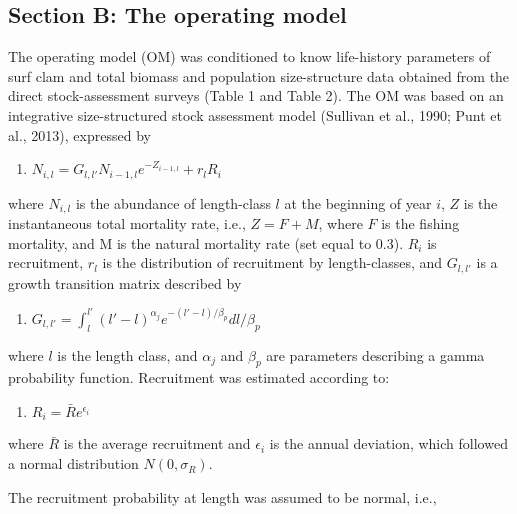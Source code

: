 \documentclass[]{article}
\providecommand{\tightlist}{%
  \setlength{\itemsep}{0pt}\setlength{\parskip}{0pt}}
\begin{document}
\hypertarget{section-b-the-operating-model}{%
\subsection{Section B: The operating
model}\label{section-b-the-operating-model}}

The operating model (OM) was conditioned to know life-history parameters
of surf clam and total biomass and population size-structure data
obtained from the direct stock-assessment surveys (Table 1 and Table 2).
The OM was based on an integrative size-structured stock assessment
model (Sullivan et al., 1990; Punt et al., 2013), expressed by

\begin{enumerate}
\def\labelenumi{\arabic{enumi})}
\setcounter{enumi}{1}
\tightlist
\item
  \(N_{i,l}=G_{l,l'} N_{i-1,l} e^{-Z_{i-1,l} }+ r_l R_i\)
\end{enumerate}

where \(N_{i,l}\) is the abundance of length-class \(l\) at the
beginning of year \(i\), \(Z\) is the instantaneous total mortality
rate, i.e., \(Z=F+M\), where \(F\) is the fishing mortality, and M is
the natural mortality rate (set equal to 0.3). \(R_i\) is recruitment,
\(r_l\) is the distribution of recruitment by length-classes, and
\(G_{l,l'}\) is a growth transition matrix described by

\begin{enumerate}
\def\labelenumi{\arabic{enumi})}
\setcounter{enumi}{2}
\tightlist
\item
  \(G_{l,l'}=\int_l^{l'} (l'-l)^{\alpha_j} e^{-(l'-l)/\beta_p } dl/\beta_p\)
\end{enumerate}

where \(l\) is the length class, and \(\alpha_j\) and \(\beta_p\) are
parameters describing a gamma probability function. Recruitment was
estimated according to:

\begin{enumerate}
\def\labelenumi{\arabic{enumi})}
\setcounter{enumi}{3}
\tightlist
\item
  \(R_i = \bar{R}e^{\epsilon_i}\)
\end{enumerate}

where \(\bar{R}\) is the average recruitment and \(\epsilon_i\) is the
annual deviation, which followed a normal distribution
\(N(0,\sigma_R)\).

The recruitment probability at length was assumed to be normal, i.e.,
\end{document}
